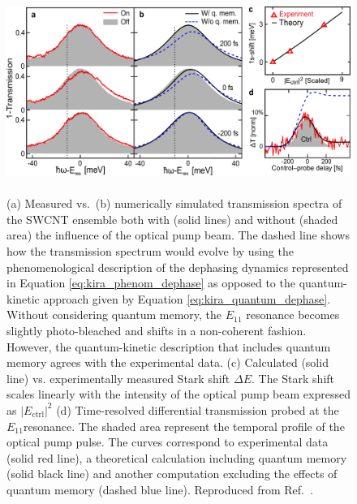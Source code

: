 \begin{figure}[ht]
	\centering
	\includegraphics[height=2.6in]{images/chapter_coherent/nonresonant}
	\caption{(a) Measured vs.\ (b) numerically simulated transmission spectra of the SWCNT ensemble both with (solid lines) and without (shaded area) the influence of the optical pump beam. The dashed line shows how the transmission spectrum would evolve by using the phenomenological description of the dephasing dynamics represented in Equation \eqref{eq:kira_phenom_dephase} as opposed to the quantum-kinetic approach given by Equation \eqref{eq:kira_quantum_dephase}. Without considering quantum memory, the $E_{11}$ resonance becomes slightly photo-bleached and shifts in a non-coherent fashion. However, the quantum-kinetic description that includes quantum memory agrees with the experimental data. (c) Calculated (solid line) vs. experimentally measured Stark shift $\Delta E$. The Stark shift scales linearly with the intensity of the optical pump beam expressed as $|E_\text{ctrl}|^2$ (d) Time-resolved differential transmission probed at the $E_{11}$resonance. The shaded area represent the temporal profile of the optical pump pulse. The curves correspond to experimental data (solid red line), a theoretical calculation including quantum memory (solid black line) and another computation excluding the effects of quantum memory (dashed blue line). Reproduced from Ref.\ \cite{mack2019}.}

  \label{fig:ose_kira_nonresonant}
\end{figure}

